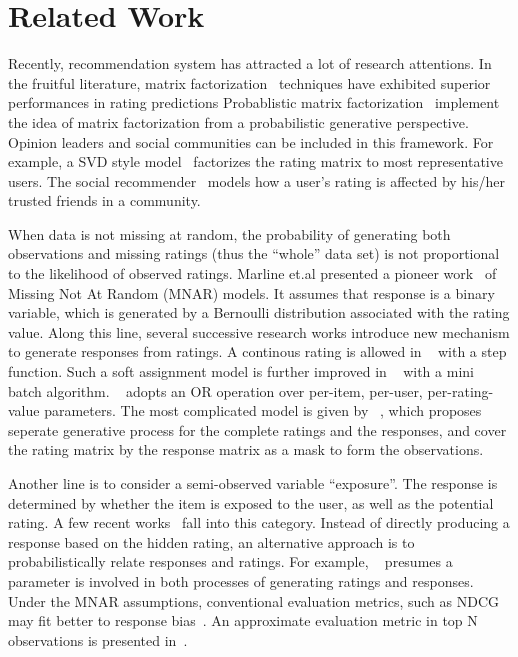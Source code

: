 \documentclass{sig-alternate}
\begin{document}
\section{Related Work}\label{sec:related}
Recently, recommendation system has attracted a lot of research attentions. In the fruitful literature, matrix factorization~\cite{Koren2009Matrix} techniques have exhibited superior performances in rating predictions Probablistic matrix factorization~\cite{salakhutdinov2008probabilistic} implement the idea of matrix factorization from a probabilistic generative perspective. Opinion leaders and social communities can be included in this framework. For example, a SVD style model~\cite{Liu2011Wisdom} factorizes the rating matrix to most representative users. The social recommender~\cite{Jamali2011Generalized} models how a user's rating is affected by his/her trusted friends in a community.


When data is not missing at random, the probability of generating both observations and missing ratings (thus the ``whole'' data set) is not proportional to the likelihood of observed ratings. Marline et.al presented a pioneer work~\cite{Marlin2009Collaborative} of Missing Not At Random (MNAR) models. It assumes that response is a binary variable, which is generated by a Bernoulli distribution associated with the rating value. Along this line, several successive research works introduce new mechanism to generate responses from ratings. A continous rating is allowed in ~\cite{Ling2012Response} with a step function. Such a soft assignment model is further improved in ~\cite{Yang2015Boosting} with a mini batch algorithm. ~\cite{Kim2014Bayesian} adopts an OR operation over per-item, per-user, per-rating-value parameters. The most complicated model is given by ~\cite{Hernandez-Lobato2014Probabilistic}, which proposes seperate generative process for the complete ratings and the responses, and cover the rating matrix by the response matrix as a mask to form the observations.

Another line is to consider a semi-observed variable ``exposure''. The response is determined by whether the item is exposed to the user, as well as the potential rating. A few recent works~\cite{Liang2016Modeling,Gopalan2015Scalable} fall into this category. Instead of directly producing a response based on the hidden rating, an alternative approach is to probabilistically relate responses and ratings. For example, ~\cite{Ohsawa2016Gated} presumes a parameter is involved in both processes of generating ratings and responses. Under the MNAR assumptions, conventional evaluation metrics, such as NDCG may fit better to response bias~\cite{Pradel2012Ranking}. An approximate evaluation metric in top N observations is presented in~\cite{Steck2010Training}.
\end{document}
